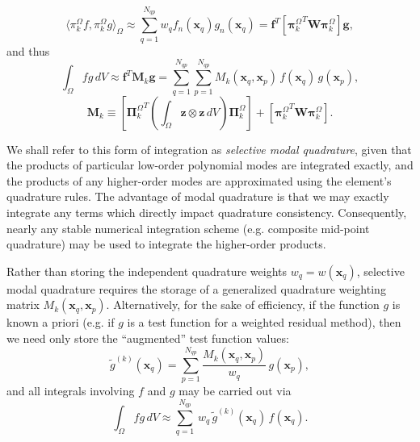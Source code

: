 	\begin{equation}
		\langle \pi^{\Omega}_k f, \pi^{\Omega}_k g \rangle_{\Omega} \approx \sum_{q=1}^{N_{qp}} w_q f_n(\mathbf{x}_q) g_n(\mathbf{x}_q) = \mathbf{f}^T \left[ {\boldsymbol{\pi}^{\Omega}_k}^T \mathbf{W} \boldsymbol{\pi}^{\Omega}_k \right] \mathbf{g},
	\end{equation}
	and thus
	\begin{equation}
		\int_\Omega f g \, dV \approx \mathbf{f}^T \mathbf{M}_k \mathbf{g} = \sum_{q = 1}^{N_{qp}} \sum_{p = 1}^{N_{qp}} M_k (\mathbf{x}_q,\mathbf{x}_p) \, f (\mathbf{x}_q) \, g (\mathbf{x}_p),
	\end{equation}
	\begin{equation}
		\mathbf{M}_k \equiv \left[ {\boldsymbol{\Pi}^{\Omega}_k}^T \left( \int_{\Omega} \mathbf{z} \otimes \mathbf{z} \, dV \right) \boldsymbol{\Pi}^{\Omega}_k \right] + \left[ {\boldsymbol{\pi}^{\Omega}_k}^T \mathbf{W} \boldsymbol{\pi}^{\Omega}_k \right].
	\end{equation}
	
	We shall refer to this form of integration as \textit{selective modal quadrature}, given that the products of particular low-order polynomial modes are integrated exactly, and the products of any higher-order modes are approximated using the element's quadrature rules. The advantage of modal quadrature is that we may exactly integrate any terms which directly impact quadrature consistency. Consequently, nearly any stable numerical integration scheme (e.g. composite mid-point quadrature) may be used to integrate the higher-order products.
	
	Rather than storing the independent quadrature weights $w_q = w (\mathbf{x}_q)$, selective modal quadrature requires the storage of a generalized quadrature weighting matrix $M_k (\mathbf{x}_q,\mathbf{x}_p)$. Alternatively, for the sake of efficiency, if the function $g$ is known a priori (e.g. if $g$ is a test function for a weighted residual method), then we need only store the ``augmented'' test function values:
	\begin{equation}
		\tilde{g}^{(k)} (\mathbf{x}_q) = \sum_{p = 1}^{N_{qp}} \frac{M_k (\mathbf{x}_q,\mathbf{x}_p)}{w_q} \, g (\mathbf{x}_p),
	\end{equation}		
	and all integrals involving $f$ and $g$ may be carried out via
	\begin{equation}
		\int_\Omega f g \, dV \approx \sum_{q = 1}^{N_{qp}} \, w_q \, \tilde{g}^{(k)} (\mathbf{x}_q) \, f (\mathbf{x}_q).
	\end{equation}
	

